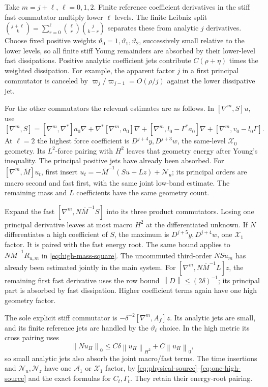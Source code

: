 \documentclass[11pt,a4paper]{article}
\numberwithin{equation}{section}
\theoremstyle{remark}
\newcommand{\norm}[1]{\left\lVert #1\right\rVert}
\newcommand{\Xzero}{\mathcal X_0}
\newcommand{\Xone}{\mathcal X_1}
\newcommand{\Aone}{\mathcal A_1}
\begin{document}
Take \(m=j+\ell\), \(\ell=0,1,2\).
Finite reference coefficient derivatives in the stiff fast
commutator multiply lower \(\ell\) levels. The finite Leibniz
split
\(\binom{j+\ell}{k}=\sum_{r=0}^{\ell}\binom{\ell}{r}\binom{j}{k-r}\)
separates these from analytic \(j\) derivatives. Choose fixed positive
weights \(\vartheta_0=1,\vartheta_1,\vartheta_2\), successively small
relative to the lower levels, so all finite stiff Young remainders
are absorbed by their lower-level fast dissipations. Positive
analytic coefficient jets contribute \(C(\rho+\eta)\) times the
weighted dissipation. For example, the apparent factor \(j\) in a
first principal commutator is canceled by
\(\varpi_j/\varpi_{j-1}=O(\rho/j)\) against the lower dissipative jet.

For the other commutators the relevant estimates are as follows.
In \([\nabla^m,S]u\), use
\[
 [\nabla^m,S]
 =[\nabla^m,\nabla^*]a_0\nabla
   +\nabla^*[\nabla^m,a_0]\nabla
   +[\nabla^m,l_0-\Gamma^*a_0]\nabla
   +[\nabla^m,v_0-l_0\Gamma].
\]
At \(\ell=2\) the highest force coefficient is
\(D^{j+4}y,D^{j+3}w\), the same-level \(\Xzero\) geometry.
Its \(L^2\)-force pairing with \(H^2\) leaves that geometry energy
after Young's inequality. The principal positive jets have already
been absorbed. For \([\nabla^m,\overline M]u_t\), first insert
\(u_t=-\overline M^{-1}(Su+Lz)+\mathcal N_u\); its principal orders
are macro second and fast first, with the same joint low-band
estimate. The remaining mass and \(L\) coefficients have the same
geometry count.

Expand the fast \([\nabla^m,N\overline M^{-1}S]\) into its three
product commutators. Losing one principal derivative leaves at most
macro \(H^2\) at the differentiated unknown. If \(N\) differentiates
a high coefficient of \(S\), the maximum is
\(D^{j+5}y,D^{j+4}w\), one \(\Xone\) factor. It is paired with
the fast energy root. The same bound applies to
\(N\overline M^{-1}R_{u,m}\) in \eqref{eq:high-mass-square}.
The uncommuted third-order \(NSu_m\) has already been estimated
jointly in the main system.
For \([\nabla^m,N\overline M^{-1}L]z\), the remaining first fast
derivative uses the row bound \(\norm D\leq(2\delta)^{-1}\);
its principal part is absorbed by fast dissipation. Higher
coefficient terms again have one high geometry factor.

The sole explicit stiff commutator is
\(-\delta^{-2}[\nabla^m,A_f]z\).
Its analytic jets are small, and its finite reference jets are
handled by the \(\vartheta_\ell\) choice. In the high metric its
cross pairing uses
\[
 \norm{Nu_H}_0\leq C\delta\norm{u_H}_{H^2}+C\norm{u_H}_0 ,
\]
so small analytic jets also absorb the joint macro/fast terms.
The time insertions and \(\mathcal N_u,\mathcal N_z\) have one
\(\Aone\) or \(\Xone\) factor, by
\eqref{eq:physical-source}--\eqref{eq:one-high-source} and the exact
formulas for \(C_t,\Gamma_t\). They retain their energy-root pairing.
\end{document}
